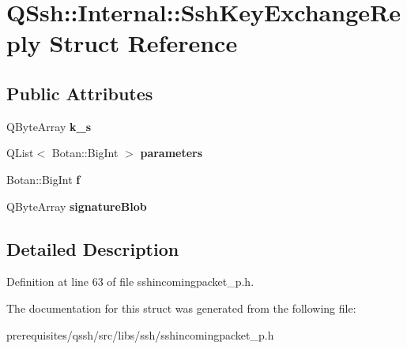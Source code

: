 \hypertarget{struct_q_ssh_1_1_internal_1_1_ssh_key_exchange_reply}{}\section{Q\+Ssh\+:\+:Internal\+:\+:Ssh\+Key\+Exchange\+Reply Struct Reference}
\label{struct_q_ssh_1_1_internal_1_1_ssh_key_exchange_reply}
\subsection*{Public Attributes}
\begin{DoxyCompactItemize}
\item 
\mbox{\label{struct_q_ssh_1_1_internal_1_1_ssh_key_exchange_reply_aa74a65e33e09fe2e5bf02a924af7fb1d}} 
Q\+Byte\+Array {\bfseries k\+\_\+s}
\item 
\mbox{\label{struct_q_ssh_1_1_internal_1_1_ssh_key_exchange_reply_accec2fe9ebca1ecb9d39be8e0dd66d9e}} 
Q\+List$<$ Botan\+::\+Big\+Int $>$ {\bfseries parameters}
\item 
\mbox{\label{struct_q_ssh_1_1_internal_1_1_ssh_key_exchange_reply_a02a84319d501ea3877f08fe97c324e01}} 
Botan\+::\+Big\+Int {\bfseries f}
\item 
\mbox{\label{struct_q_ssh_1_1_internal_1_1_ssh_key_exchange_reply_a03f9e8f2ebd0a2ad9a17e8dd8ab52478}} 
Q\+Byte\+Array {\bfseries signature\+Blob}
\end{DoxyCompactItemize}


\subsection{Detailed Description}


Definition at line 63 of file sshincomingpacket\+\_\+p.\+h.



The documentation for this struct was generated from the following file\+:\begin{DoxyCompactItemize}
\item 
prerequisites/qssh/src/libs/ssh/sshincomingpacket\+\_\+p.\+h\end{DoxyCompactItemize}
